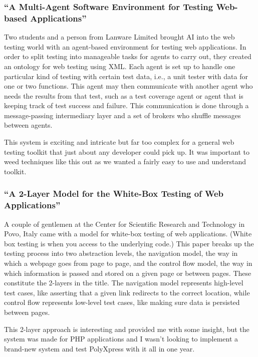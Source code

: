 \documentclass[11pt]{article}
\begin{document}
\subsubsection{``A Multi-Agent Software Environment for Testing Web-based Applications'' \cite{MultiAgentSoftwareEnvironment}}
Two students and a person from Lanware Limited brought AI into the web testing world with an agent-based environment for testing web applications. In order to split testing into manageable tasks for agents to carry out, they created an ontology for web testing using XML. Each agent is set up to handle one particular kind of testing with certain test data, i.e., a unit tester with data for one or two functions. This agent may then communicate with another agent who needs the results from that test, such as a test coverage agent or agent that is keeping track of test success and failure. This communication is done through a message-passing intermediary layer and a set of brokers who shuffle messages between agents.

This system is exciting and intricate but far too complex for a general web testing toolkit that just about any developer could pick up. It was important to weed techniques like this out as we wanted a fairly easy to use and understand toolkit.

\subsubsection{``A 2-Layer Model for the White-Box Testing of Web Applications'' \cite{2LayerModel}}
A couple of gentlemen at the Center for Scientific Research and Technology in Povo, Italy came with a model for white-box testing of web applications. (White box testing is when you access to the underlying code.) This paper breaks up the testing process into two abstraction levels, the navigation model, the way in which a webpage goes from page to page, and the control flow model, the way in which information is passed and stored on a given page or between pages. These constitute the 2-layers in the title. The navigation model represents high-level test cases, like asserting that a given link redirects to the correct location, while control flow represents low-level test cases, like making sure data is persisted between pages. 

This 2-layer approach is interesting and provided me with some insight, but the system was made for PHP applications and I wasn't looking to implement a brand-new system and test PolyXpress with it all in one year.
\end{document}

